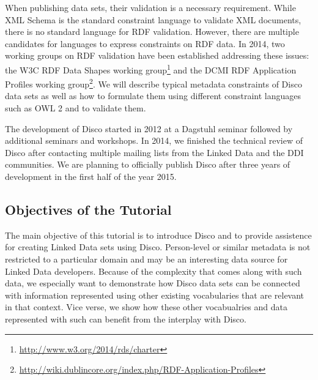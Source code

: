 \documentclass{llncs}
\begin{document}
When publishing data sets, their validation is a necessary requirement.
While XML Schema is the standard constraint language to validate XML documents, there is no standard language for RDF validation.
However, there are multiple candidates for languages to express constraints on RDF data.
In 2014, two working groups on RDF validation have been established addressing these issues: the W3C RDF Data Shapes working group\footnote{\url{http://www.w3.org/2014/rds/charter}} and the DCMI RDF Application Profiles working group\footnote{\url{http://wiki.dublincore.org/index.php/RDF-Application-Profiles}}.
We will describe typical metadata constraints of Disco data sets as well as how to formulate them using different constraint languages such as OWL 2 and to validate them.

The development of Disco started in 2012 at a Dagstuhl seminar followed by additional seminars and workshops.  
In 2014, we finished the technical review of Disco after contacting multiple mailing lists from the Linked Data and the DDI communities. 
We are planning to officially publish Disco after three years of development in the first half of the year 2015. 

\subsection{Objectives of the Tutorial} 
The main objective of this tutorial is to introduce Disco and to provide assistence for creating Linked Data sets using Disco. Person-level or similar metadata is not restricted to a particular domain and may be an interesting data source for Linked Data developers.
Because of the complexity that comes along with such data, we especially want to demonstrate how Disco data sets can be connected with information represented using other existing vocabularies that are relevant in that context. Vice verse, we show how these other vocabualries and data represented with such can benefit from the interplay with Disco.
\end{document}
